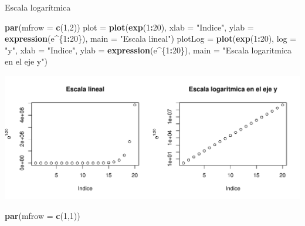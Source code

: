 \documentclass[
  ignorenonframetext,
]{beamer}
\newenvironment{Shaded}{\begin{snugshade}}{\end{snugshade}}
\newcommand{\AttributeTok}[1]{\textcolor[rgb]{0.13,0.29,0.53}{#1}}
\newcommand{\DecValTok}[1]{\textcolor[rgb]{0.00,0.00,0.81}{#1}}
\newcommand{\FunctionTok}[1]{\textcolor[rgb]{0.13,0.29,0.53}{\textbf{#1}}}
\newcommand{\NormalTok}[1]{#1}
\newcommand{\OtherTok}[1]{\textcolor[rgb]{0.56,0.35,0.01}{#1}}
\newcommand{\SpecialCharTok}[1]{\textcolor[rgb]{0.81,0.36,0.00}{\textbf{#1}}}
\newcommand{\StringTok}[1]{\textcolor[rgb]{0.31,0.60,0.02}{#1}}
\begin{document}
\begin{frame}[fragile]{Escala logarítmica}
\label{escala-logaruxedtmica}
\begin{Shaded}
\begin{Highlighting}[]
\FunctionTok{par}\NormalTok{(}\AttributeTok{mfrow =} \FunctionTok{c}\NormalTok{(}\DecValTok{1}\NormalTok{,}\DecValTok{2}\NormalTok{))}
\NormalTok{plot }\OtherTok{=} \FunctionTok{plot}\NormalTok{(}\FunctionTok{exp}\NormalTok{(}\DecValTok{1}\SpecialCharTok{:}\DecValTok{20}\NormalTok{), }\AttributeTok{xlab =} \StringTok{"Indice"}\NormalTok{,}
            \AttributeTok{ylab =} \FunctionTok{expression}\NormalTok{(e}\SpecialCharTok{\^{}}\NormalTok{\{}\DecValTok{1}\SpecialCharTok{:}\DecValTok{20}\NormalTok{\}), }
            \AttributeTok{main =} \StringTok{"Escala lineal"}\NormalTok{)}
\NormalTok{plotLog }\OtherTok{=} \FunctionTok{plot}\NormalTok{(}\FunctionTok{exp}\NormalTok{(}\DecValTok{1}\SpecialCharTok{:}\DecValTok{20}\NormalTok{), }\AttributeTok{log =} \StringTok{"y"}\NormalTok{, }\AttributeTok{xlab =} \StringTok{"Indice"}\NormalTok{, }
               \AttributeTok{ylab =} \FunctionTok{expression}\NormalTok{(e}\SpecialCharTok{\^{}}\NormalTok{\{}\DecValTok{1}\SpecialCharTok{:}\DecValTok{20}\NormalTok{\}), }
               \AttributeTok{main =} \StringTok{"Escala logaritmica en el eje y"}\NormalTok{)}
\end{Highlighting}
\end{Shaded}

\begin{center}\includegraphics[width=0.7\linewidth]{R_base_files/figure-beamer/unnamed-chunk-36-1} \end{center}

\begin{Shaded}
\begin{Highlighting}[]
\FunctionTok{par}\NormalTok{(}\AttributeTok{mfrow =} \FunctionTok{c}\NormalTok{(}\DecValTok{1}\NormalTok{,}\DecValTok{1}\NormalTok{))}
\end{Highlighting}
\end{Shaded}
\end{frame}
\end{document}

